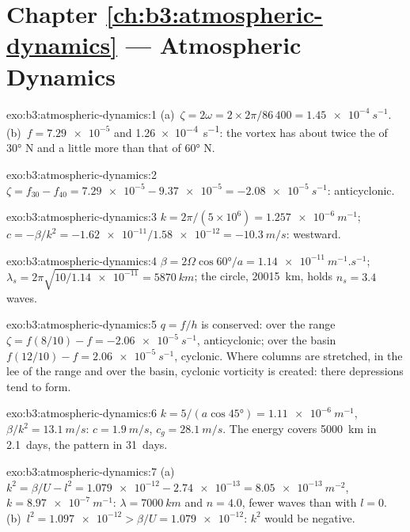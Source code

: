 \section*{Chapter \ref{ch:b3:atmospheric-dynamics} --- Atmospheric Dynamics}

\begin{solution}{exo:b3:atmospheric-dynamics:1}
(a)~$\zeta = 2\omega = 2\times2\pi/86\,400 = \qty{1.45e-4}{s^{-1}}$.
(b)~$f = \num{7.29e-5}$ and \qty{1.26e-4}{s^{-1}}: the vortex has about
twice the  of \ang{30} N and a little more than that of
\ang{60} N.
\end{solution}

\begin{solution}{exo:b3:atmospheric-dynamics:2}
$\zeta = f_{30} - f_{40} = \num{7.29e-5} - \num{9.37e-5} =
\qty{-2.08e-5}{s^{-1}}$: anticyclonic.
\end{solution}

\begin{solution}{exo:b3:atmospheric-dynamics:3}
$k = 2\pi/(5\times10^6) = \qty{1.257e-6}{m^{-1}}$; $c = -\beta/k^2 =
-\num{1.62e-11}/\num{1.58e-12} = \qty{-10.3}{m/s}$: westward.
\end{solution}

\begin{solution}{exo:b3:atmospheric-dynamics:4}
$\beta = 2\Omega\cos\ang{60}/a = \qty{1.14e-11}{m^{-1}.s^{-1}}$;
$\lambda_s = 2\pi\sqrt{10/\num{1.14e-11}} = \qty{5870}{km}$; the circle,
\qty{20015}{km}, holds $n_s = 3.4$ waves.
\end{solution}

\begin{solution}{exo:b3:atmospheric-dynamics:5}
$q = f/h$ is conserved: over the range $\zeta = f(8/10) - f =
\qty{-2.06e-5}{s^{-1}}$, anticyclonic; over the basin $f(12/10) - f =
\qty{+2.06e-5}{s^{-1}}$, cyclonic. Where columns are stretched, in the lee
of the range and over the basin, cyclonic vorticity is created: there
depressions tend to form.
\end{solution}

\begin{solution}{exo:b3:atmospheric-dynamics:6}
$k = 5/(a\cos\ang{45}) = \qty{1.11e-6}{m^{-1}}$, $\beta/k^2 =
\qty{13.1}{m/s}$: $c = \qty{1.9}{m/s}$, $c_g = \qty{28.1}{m/s}$. The energy
covers \qty{5000}{km} in \num{2.1}~days, the pattern in \num{31}~days.
\end{solution}

\begin{solution}{exo:b3:atmospheric-dynamics:7}
(a)~$k^2 = \beta/U - l^2 = \num{1.079e-12} - \num{2.74e-13} =
\qty{8.05e-13}{m^{-2}}$, $k = \qty{8.97e-7}{m^{-1}}$: $\lambda =
\qty{7000}{km}$ and $n = 4.0$, fewer waves than with $l = 0$. (b)~$l^2 =
\num{1.097e-12} > \beta/U = \num{1.079e-12}$: $k^2$ would be negative.
\end{solution}

